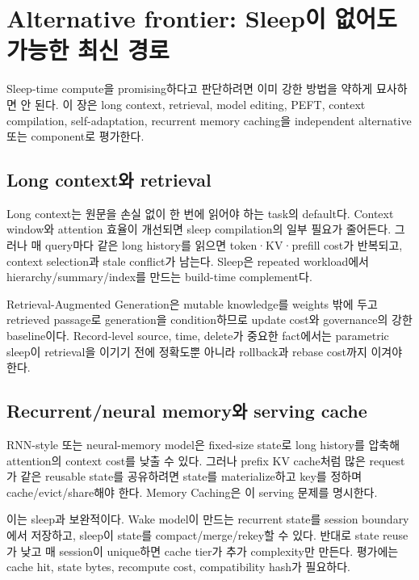 \chapter{Alternative frontier: Sleep이 없어도 가능한 최신 경로}
\label{STC-S06}

Sleep-time compute을 promising하다고 판단하려면 이미 강한 방법을 약하게 묘사하면 안 된다. 이 장은
long context, retrieval, model editing, PEFT, context compilation, self-adaptation, recurrent memory
caching을 independent alternative 또는 component로 평가한다.

\section{Long context와 retrieval}

Long context는 원문을 손실 없이 한 번에 읽어야 하는 task의 default다. Context window와 attention
효율이 개선되면 sleep compilation의 일부 필요가 줄어든다. 그러나 매 query마다 같은 long history를
읽으면 token·KV·prefill cost가 반복되고, context selection과 stale conflict가 남는다. Sleep은 repeated
workload에서 hierarchy/summary/index를 만드는 build-time complement다.

Retrieval-Augmented Generation은 mutable knowledge를 weights 밖에 두고 retrieved passage로 generation을
condition하므로 update cost와 governance의 강한 baseline이다.
\parencite{srcstc0031} Record-level source, time, delete가 중요한 fact에서는 parametric sleep이 retrieval을
이기기 전에 정확도뿐 아니라 rollback과 rebase cost까지 이겨야 한다.

\section{Recurrent/neural memory와 serving cache}

RNN-style 또는 neural-memory model은 fixed-size state로 long history를 압축해 attention의 context cost를
낮출 수 있다. 그러나 prefix KV cache처럼 많은 request가 같은 reusable state를 공유하려면 state를
materialize하고 key를 정하며 cache/evict/share해야 한다. Memory Caching은 이 serving 문제를 명시한다.
 \parencite{srcstc0022}

이는 sleep과 보완적이다. Wake model이 만드는 recurrent state를 session boundary에서 저장하고, sleep이
state를 compact/merge/rekey할 수 있다. 반대로 state reuse가 낮고 매 session이 unique하면 cache tier가
추가 complexity만 만든다. 평가에는 cache hit, state bytes, recompute cost, compatibility hash가 필요하다.

